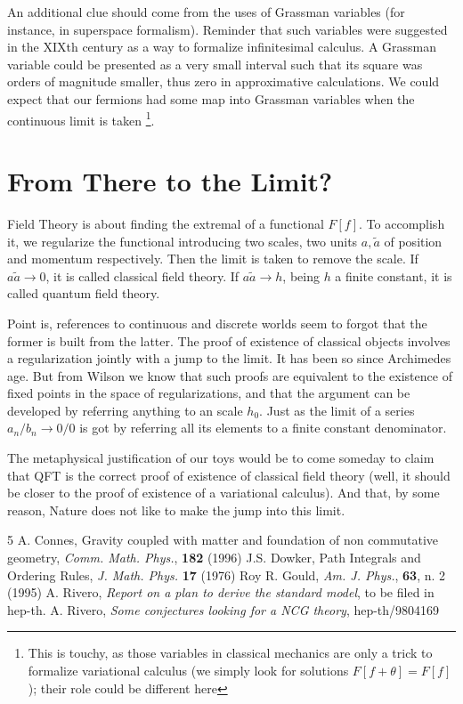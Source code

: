 \documentclass[a4paper,10pt]{article}
\begin{document}
An additional clue should come from the uses of Grassman variables (for
instance, in superspace formalism). Reminder that such variables were
suggested in the XIXth century as a way to formalize 
infinitesimal calculus. A Grassman variable could be presented as a
very small interval such that its square was orders of magnitude smaller,
thus zero in approximative calculations. We could expect that our fermions
had some map into Grassman variables when the continuous limit is taken
\footnote{This is touchy, as those variables in classical mechanics are
only a trick to formalize variational calculus (we simply look for
solutions $F[f+\theta]=F[f]$); their role could be different here}.

\section{From There to the Limit?}
Field Theory is about finding the extremal of a functional $F[f]$. To
 accomplish it,
we regularize the functional introducing two scales, two units $a,\tilde a$ 
of position and momentum respectively. Then the limit is taken to remove
the scale. If $a\tilde a \to 0$, it is called classical field theory. If
$a\tilde a \to h$, being $h$ a finite constant, it is called quantum
field theory.

Point is, references to continuous and discrete worlds seem to
forgot that the
former is built from the latter. The proof of existence of classical
objects involves a regularization jointly with a jump to the limit. It
has been so since Archimedes age. But
from Wilson we know that such proofs are equivalent to the
existence of fixed points in the space of regularizations, and that
the argument can be developed by referring anything to an scale $h_0$. Just
as the limit of a series $a_n/b_n \to 0/0 $ is got by referring all its
elements to a finite constant denominator. 

The metaphysical
justification of our toys would be to come someday to claim 
that QFT is the correct
proof of existence of classical field theory (well,
it should be closer to the proof of existence of a variational calculus). 
And that, by some reason, Nature does not like to make the jump into
this limit.
 


\begin{thebibliography}{5}
 A. Connes, Gravity coupled with matter and foundation
of non commutative geometry, {\it Comm. Math. Phys.}, {\bf 182} (1996)
 J.S. Dowker,  Path Integrals and Ordering
Rules, {\it J. Math. Phys.} {\bf 17} (1976)
 Roy R. Gould, {\it Am. J. Phys.}, {\bf 63}, n. 2 (1995)
 A. Rivero, {\it Report on a plan to derive the standard
model}, to be filed in hep-th.
 A. Rivero, {\it Some conjectures looking for a NCG theory},
 hep-th/9804169 
\end{thebibliography}
\end{document}
